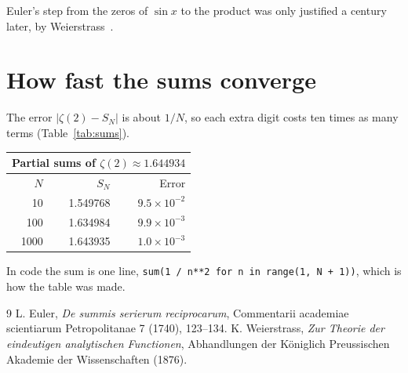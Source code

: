 \documentclass[11pt]{article}
\newcommand{\abs}[1]{\left\lvert #1 \right\rvert}
\newcommand{\partialsum}[1]{S_{#1}}
\theoremstyle{definition}
\begin{document}
Euler's step from the zeros of $\sin x$ to the product was only justified a century later, by Weierstrass~\cite{weierstrass1876}.

\section{How fast the sums converge}
\label{sec:numbers}

The error $\abs{\zeta(2) - \partialsum{N}}$ is about $1/N$, so each extra digit costs ten times as many terms (Table~\ref{tab:sums}).

\begin{center}
\begin{tabular}{rrr}
  \toprule
  \multicolumn{3}{c}{Partial sums of $\zeta(2) \approx 1.644934$} \\
  \midrule
  $N$ & $\partialsum{N}$ & Error \\
  \midrule
  10 & 1.549768 & $9.5 \times 10^{-2}$ \\
  100 & 1.634984 & $9.9 \times 10^{-3}$ \\
  1000 & 1.643935 & $1.0 \times 10^{-3}$ \\
  \bottomrule
\end{tabular}
\end{center}
\label{tab:sums}

In code the sum is one line, \verb|sum(1 / n**2 for n in range(1, N + 1))|, which is how the table was made.

\begin{thebibliography}{9}
 L. Euler, \emph{De summis serierum reciprocarum}, Commentarii academiae scientiarum Petropolitanae 7 (1740), 123--134.
 K. Weierstrass, \emph{Zur Theorie der eindeutigen analytischen Functionen}, Abhandlungen der Königlich Preussischen Akademie der Wissenschaften (1876).
\end{thebibliography}
\end{document}
